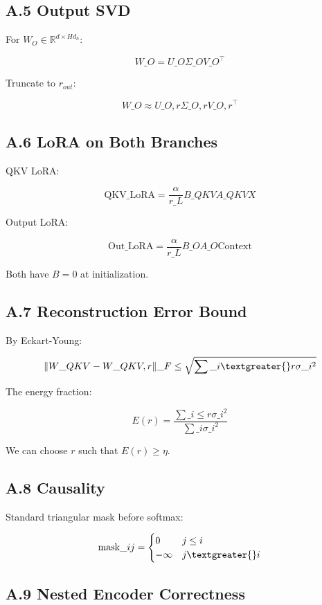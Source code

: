 \subsection{A.5 Output SVD}

For $W_O \in \mathbb{R}^{d \times H d_h}$:

\[
W\_O = U\_O \Sigma\_O V\_O^\top
\]

Truncate to $r_{out}$:

\[
W\_O \approx U\_{O, r} \Sigma\_{O, r} V\_{O, r}^\top
\]

\subsection{A.6 LoRA on Both Branches}

QKV LoRA:

\[
\text{QKV}\_\text{LoRA} = \frac{\alpha}{r\_L} B\_{QKV} A\_{QKV} X
\]

Output LoRA:

\[
\text{Out}\_\text{LoRA} = \frac{\alpha}{r\_L} B\_O A\_O \text{Context}
\]

Both have $B = 0$ at initialization.

\subsection{A.7 Reconstruction Error Bound}

By Eckart-Young:

\[
\|W\_{QKV} - W\_{QKV, r}\|\_F \leq \sqrt{\sum\_{i \textgreater{} r} \sigma\_i^2}
\]

The energy fraction:

\[
E(r) = \frac{\sum\_{i \leq r} \sigma\_i^2}{\sum\_i \sigma\_i^2}
\]

We can choose $r$ such that $E(r) \geq \eta$.

\subsection{A.8 Causality}

Standard triangular mask before softmax:

\[
\text{mask}\_{ij} = \begin{cases} 0 & j \leq i \\ -\infty & j \textgreater{} i \end{cases}
\]

\subsection{A.9 Nested Encoder Correctness}

